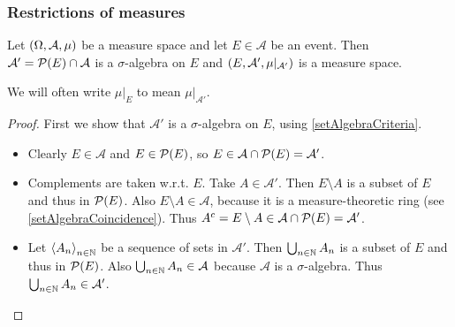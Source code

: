 \subsubsection{Restrictions of measures}
\begin{lemma} \label{submeasurespace}
Let $\left( \Omega,\mathcal{A},\mu \right)$ be a measure space and let $E\in\mathcal{A}$ be an event. Then $\mathcal{A}' = \operatorname{\mathcal{P}}(E)\cap\mathcal{A}$ is a $\sigma$-algebra on $E$ and $\left( E,\mathcal{A}',\mu|_{\mathcal{A}'} \right)$ is a measure space.
\end{lemma}
We will often write $\mu|_E$ to mean $\mu|_{\mathcal{A}'}$.
\begin{proof}
First we show that $\mathcal{A}'$ is a $\sigma$-algebra on $E$, using \ref{setAlgebraCriteria}.
\begin{itemize}
\item Clearly $E\in \mathcal{A}$ and $E\in\operatorname{\mathcal{P}}(E)$, so $E\in\mathcal{A}\cap \operatorname{\mathcal{P}}(E) = \mathcal{A}'$.
\item Complements are taken w.r.t. $E$. Take $A\in \mathcal{A}'$. Then $E\setminus A$ is a subset of $E$ and thus in $\operatorname{\mathcal{P}}(E)$. Also $E\setminus A\in \mathcal{A}$, because it is a measure-theoretic ring (see \ref{setAlgebraCoincidence}). Thus $A^c = E\setminus A \in \mathcal{A}\cap \operatorname{\mathcal{P}}(E) = \mathcal{A}'$.
\item Let $\left\langle A_n \right\rangle_{n\in \mathbb{N}}$ be a sequence of sets in $\mathcal{A}'$. Then $\bigcup_{n\in \mathbb{N}}A_n$ is a subset of $E$ and thus in $\operatorname{\mathcal{P}}(E)$. Also $\bigcup_{n\in \mathbb{N}}A_n\in\mathcal{A}$ because $\mathcal{A}$ is a $\sigma$-algebra. Thus $\bigcup_{n\in \mathbb{N}}A_n\in\mathcal{A}'$.
\end{itemize}
\end{proof}

